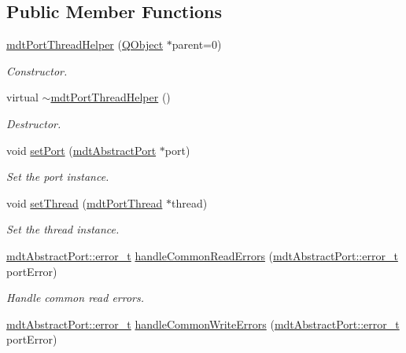 \subsection*{Public Member Functions}
\begin{DoxyCompactItemize}
\item 
\hyperlink{classmdt_port_thread_helper_a6e3b234e868b9918a26866ffeee4c0ca}{mdt\-Port\-Thread\-Helper} (\hyperlink{class_q_object}{Q\-Object} $\ast$parent=0)
\begin{DoxyCompactList}\small\item\em Constructor. \end{DoxyCompactList}\item 
virtual \hyperlink{classmdt_port_thread_helper_a5d086b22714a73fe2286f096b4cddaf9}{$\sim$mdt\-Port\-Thread\-Helper} ()
\begin{DoxyCompactList}\small\item\em Destructor. \end{DoxyCompactList}\item 
void \hyperlink{classmdt_port_thread_helper_a4127c0b28dc63df06b5a36a4be8b3bb7}{set\-Port} (\hyperlink{classmdt_abstract_port}{mdt\-Abstract\-Port} $\ast$port)
\begin{DoxyCompactList}\small\item\em Set the port instance. \end{DoxyCompactList}\item 
void \hyperlink{classmdt_port_thread_helper_af6c9d2cb2e9e922942236068bf634b0b}{set\-Thread} (\hyperlink{classmdt_port_thread}{mdt\-Port\-Thread} $\ast$thread)
\begin{DoxyCompactList}\small\item\em Set the thread instance. \end{DoxyCompactList}\item 
\hyperlink{classmdt_abstract_port_ad4121bb930c95887e77f8bafa065a85e}{mdt\-Abstract\-Port\-::error\-\_\-t} \hyperlink{classmdt_port_thread_helper_a53d0eacc7048cf32566785a7fb527458}{handle\-Common\-Read\-Errors} (\hyperlink{classmdt_abstract_port_ad4121bb930c95887e77f8bafa065a85e}{mdt\-Abstract\-Port\-::error\-\_\-t} port\-Error)
\begin{DoxyCompactList}\small\item\em Handle common read errors. \end{DoxyCompactList}\item 
\hyperlink{classmdt_abstract_port_ad4121bb930c95887e77f8bafa065a85e}{mdt\-Abstract\-Port\-::error\-\_\-t} \hyperlink{classmdt_port_thread_helper_a84871009b6128912f7d3869b14e37aa2}{handle\-Common\-Write\-Errors} (\hyperlink{classmdt_abstract_port_ad4121bb930c95887e77f8bafa065a85e}{mdt\-Abstract\-Port\-::error\-\_\-t} port\-Error)

\end{DoxyCompactItemize}
